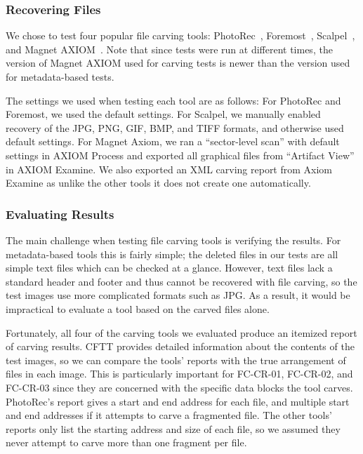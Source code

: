 \subsubsection{Recovering Files}

We chose to test four popular file carving tools: PhotoRec~\cite{photorec}, Foremost~\cite{foremost}, Scalpel~\cite{scalpel}, and Magnet AXIOM~\cite{axiom_carve}.
Note that since tests were run at different times, the version of Magnet AXIOM used for carving tests is newer than the version used for metadata-based tests.

The settings we used when testing each tool are as follows:
For PhotoRec and Foremost, we used the default settings.
For Scalpel, we manually enabled recovery of the JPG, PNG, GIF, BMP, and TIFF formats, and otherwise used default settings.
For Magnet Axiom, we ran a ``sector-level scan'' with default settings in AXIOM Process and exported all graphical files from ``Artifact View'' in AXIOM Examine.
We also exported an XML carving report from Axiom Examine as unlike the other tools it does not create one automatically.

\subsubsection{Evaluating Results}
The main challenge when testing file carving tools is verifying the results. 
For metadata-based tools this is fairly simple; the deleted files in our tests are all simple text files which can be checked at a glance.
However, text files lack a standard header and footer and thus cannot be recovered with file carving, so the test images use more complicated formats such as JPG.
As a result, it would be impractical to evaluate a tool based on the carved files alone.

Fortunately, all four of the carving tools we evaluated produce an itemized report of carving results. CFTT provides detailed information about the contents of the test images, so we can compare the tools' reports with the true arrangement of files in each image. This is particularly important for FC-CR-01, FC-CR-02, and FC-CR-03 since they are concerned with the specific data blocks the tool carves. PhotoRec's report gives a start and end address for each file, and multiple start and end addresses if it attempts to carve a fragmented file. The other tools' reports only list the starting address and size of each file, so we assumed they never attempt to carve more than one fragment per file.

